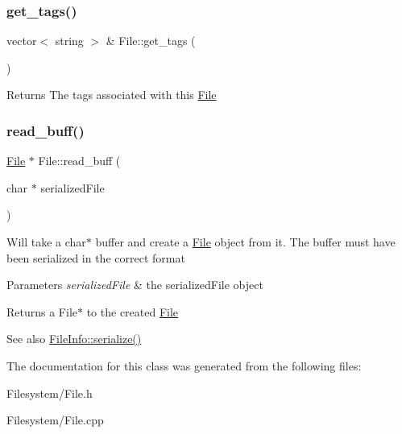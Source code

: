 \subsubsection{\texorpdfstring{get\+\_\+tags()}{get\_tags()}}
{\footnotesize\ttfamily vector$<$ string $>$ \& File\+::get\+\_\+tags (\begin{DoxyParamCaption}{ }\end{DoxyParamCaption})}

\begin{DoxyReturn}{Returns}
The tags associated with this \mbox{\hyperlink{classFile}{File}} 
\end{DoxyReturn}
\mbox{\label{classFile_abd409818fbd7f3a2319f2b27a62c8ccd}} 
\subsubsection{\texorpdfstring{read\+\_\+buff()}{read\_buff()}}
{\footnotesize\ttfamily \mbox{\hyperlink{classFile}{File}} $\ast$ File\+::read\+\_\+buff (\begin{DoxyParamCaption}\item[{char $\ast$}]{serialized\+File }\end{DoxyParamCaption})\hspace{0.3cm}{\ttfamily [static]}}

Will take a char$\ast$ buffer and create a \mbox{\hyperlink{classFile}{File}} object from it. The buffer must have been serialized in the correct format 
\begin{DoxyParams}{Parameters}
{\em serialized\+File} & the serialized\+File object \\
\hline
\end{DoxyParams}
\begin{DoxyReturn}{Returns}
a File$\ast$ to the created \mbox{\hyperlink{classFile}{File}} 
\end{DoxyReturn}
\begin{DoxySeeAlso}{See also}
\mbox{\hyperlink{classFileInfo_a64fc62c3e376dfd61088932d8b793589}{File\+Info\+::serialize()}} 
\end{DoxySeeAlso}


The documentation for this class was generated from the following files\+:\begin{DoxyCompactItemize}
\item 
Filesystem/File.\+h\item 
Filesystem/File.\+cpp\end{DoxyCompactItemize}
